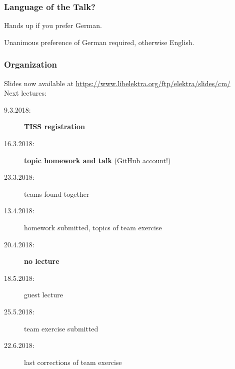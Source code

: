 \documentclass{beamer}
\date{9.3.2018}
\begin{document}
\renewcommand{\enquote}[1]{\emph{``#1''}} %

\begin{frame}
	\titlepage
	\doclicenseThis
\end{frame}

\begin{assignment}
	\frametitle{Language of the Talk?}
	\begin{task}
	Hands up if you prefer German.
	\end{task}
	Unanimous preference of German required, otherwise English.
\end{assignment}

\begin{frame}
	\frametitle{Organization}
	Slides now available at
	\url{https://www.libelektra.org/ftp/elektra/slides/cm/}
	\\[1cm]
	Next lectures:
	\begin{description}
		\item[9.3.2018:] \textbf{TISS registration}
		\item[16.3.2018:] \textbf{topic homework and talk} (GitHub account!)
		\item[23.3.2018:] teams found together
		\item[13.4.2018:] homework submitted, topics of team exercise
		\item[20.4.2018:] \textbf{no lecture}

		\item[18.5.2018:] guest lecture
		\item[25.5.2018:] team exercise submitted
		\item[22.6.2018:] last corrections of team exercise
	\end{description}
\end{frame}
\end{document}

